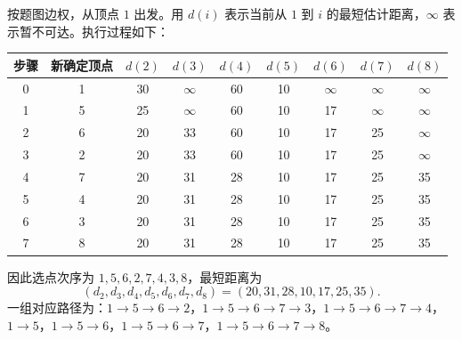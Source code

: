 \begin{question}[Dijkstra 算法]
\begin{solution}
按题图边权，从顶点 $1$ 出发。用 $d(i)$ 表示当前从 $1$ 到 $i$ 的最短估计距离，$\infty$ 表示暂不可达。执行过程如下：
\begin{center}
\begin{tabular}{c|c|ccccccc}
\toprule
步骤 & 新确定顶点 & $d(2)$ & $d(3)$ & $d(4)$ & $d(5)$ & $d(6)$ & $d(7)$ & $d(8)$ \\
\midrule
0 & 1 & 30 & $\infty$ & 60 & 10 & $\infty$ & $\infty$ & $\infty$ \\
1 & 5 & 25 & $\infty$ & 60 & 10 & 17 & $\infty$ & $\infty$ \\
2 & 6 & 20 & 33 & 60 & 10 & 17 & 25 & $\infty$ \\
3 & 2 & 20 & 33 & 60 & 10 & 17 & 25 & $\infty$ \\
4 & 7 & 20 & 31 & 28 & 10 & 17 & 25 & 35 \\
5 & 4 & 20 & 31 & 28 & 10 & 17 & 25 & 35 \\
6 & 3 & 20 & 31 & 28 & 10 & 17 & 25 & 35 \\
7 & 8 & 20 & 31 & 28 & 10 & 17 & 25 & 35 \\
\bottomrule
\end{tabular}
\end{center}
因此选点次序为 $1,5,6,2,7,4,3,8$，最短距离为
\[
(d_2,d_3,d_4,d_5,d_6,d_7,d_8)=(20,31,28,10,17,25,35).
\]
一组对应路径为：$1\to5\to6\to2$，$1\to5\to6\to7\to3$，$1\to5\to6\to7\to4$，$1\to5$，$1\to5\to6$，$1\to5\to6\to7$，$1\to5\to6\to7\to8$。
\end{solution}
\end{question}

